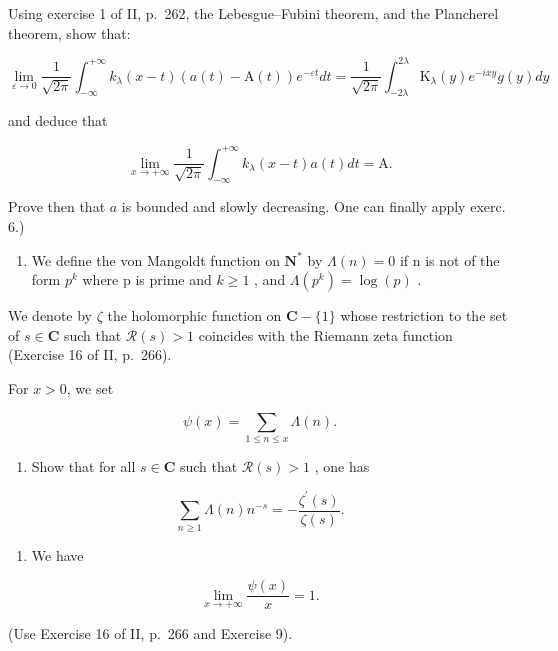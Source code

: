 Using exercise 1 of II, p.~262, the Lebesgue–Fubini theorem, and the Plancherel theorem, show that:

\[
\lim _ {\varepsilon \to 0} \frac {1}{\sqrt {2 \pi}} \int_ {- \infty} ^ {+ \infty} k _ {\lambda} (x - t) (a (t) - \mathrm{A} (t)) e ^ {- \varepsilon t} d t = \frac {1}{\sqrt {2 \pi}} \int_ {- 2 \lambda} ^ {2 \lambda} \mathrm{K} _ {\lambda} (y) e ^ {- i x y} g (y) d y
\]

and deduce that

\[
\lim _ {x \to + \infty} \frac {1}{\sqrt {2 \pi}} \int_ {- \infty} ^ {+ \infty} k _ {\lambda} (x - t) a (t) d t = \mathrm{A}.
\]

Prove then that \(a\) is bounded and slowly decreasing. One can finally apply exerc. 6.)

\begin{enumerate}
\def\labelenumi{\arabic{enumi})}
\setcounter{enumi}{9}
\tightlist
\item
  We define the von Mangoldt function on \(\mathbf{N}^{*}\) by \(\Lambda(n)=0\) if n is not of the form \(p^{k}\) where p is prime and \(k\geqslant1\) , and \(\Lambda(p^{k})=\log(p)\) .
\end{enumerate}

We denote by \(\zeta\) the holomorphic function on \(\mathbf{C} - \{1\}\) whose restriction to the set of \(s \in \mathbf{C}\) such that \(\mathcal{R}(s) > 1\) coincides with the Riemann zeta function (Exercise 16 of II, p.~266).

For \(x > 0\), we set

\[
\psi (x) = \sum_ {1 \leqslant n \leqslant x} \Lambda (n).
\]

\begin{enumerate}
\def\labelenumi{\alph{enumi})}
\tightlist
\item
  Show that for all \(s \in \mathbf{C}\) such that \(\mathcal{R}(s) > 1\) , one has
\end{enumerate}

\[
\sum_ {n \geqslant 1} \Lambda (n) n ^ {- s} = - \frac {\zeta^ {\prime} (s)}{\zeta (s)}.
\]

\begin{enumerate}
\def\labelenumi{\alph{enumi})}
\setcounter{enumi}{1}
\tightlist
\item
  We have
\end{enumerate}

\[
\lim _ {x \to + \infty} \frac {\psi (x)}{x} = 1.
\]

(Use Exercise 16 of II, p.~266 and Exercise 9).


